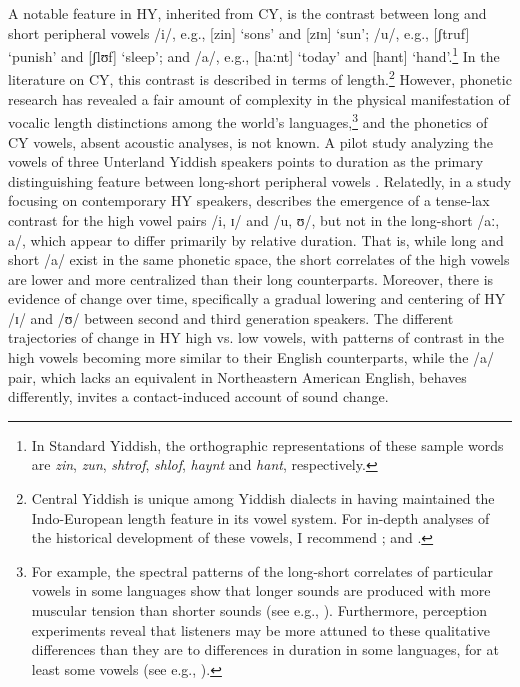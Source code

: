 \documentclass[output=paper]{langsci/langscibook}
\begin{document}
A notable feature in HY, inherited from CY, is the contrast between long and short peripheral vowels /i/, e.g., [zin] ‘sons’ and [zɪn] ‘sun’; /u/, e.g., [ʃtruf] ‘punish’ and [ʃlʊf] ‘sleep’; and /a/, e.g., [haːnt] ‘today’ and [hant] ‘hand’.\footnote{In Standard Yiddish, the orthographic representations of these sample words are \textit{zin}, \textit{zun}, \textit{shtrof}, \textit{shlof}, \textit{haynt} and \textit{hant}, respectively.} In the literature on CY, this contrast is described in terms of length.\footnote{Central Yiddish is unique among Yiddish dialects in having maintained the Indo-European length feature in its vowel system. For in-depth analyses of the historical development of these vowels, I recommend \citep{Jacobs1990, Herzog1964}; and \citep{Beider2015}.} However, phonetic research has revealed a fair amount of complexity in the physical manifestation of vocalic length distinctions among the world’s languages,\footnote{For example, the spectral patterns of the long-short correlates of particular vowels in some languages show that longer sounds are produced with more muscular tension than shorter sounds (see e.g., \citealt{AbramsonRen1990}). Furthermore, perception experiments reveal that listeners may be more attuned to these qualitative differences than they are to differences in duration in some languages, for at least some vowels (see e.g., \citealt{AbramsonRen1990, Lehiste1970, PetersonLehiste1960}).} and the phonetics of CY vowels, absent acoustic analyses, is not known. A pilot study analyzing the vowels of three Unterland Yiddish speakers points to duration as the primary distinguishing feature between long-short peripheral vowels \citep{Nove2020}. Relatedly, in a study focusing on contemporary HY speakers, \citet{Nove2018b} describes the emergence of a tense-lax contrast for the high vowel pairs /i, ɪ/ and /u, ʊ/, but not in the long-short /aː, a/, which appear to differ primarily by relative duration. That is, while long and short /a/ exist in the same phonetic space, the short correlates of the high vowels are lower and more centralized than their long counterparts. Moreover, there is evidence of change over time, specifically a gradual lowering and centering of HY /ɪ/ and /ʊ/ between second and third generation speakers. The different trajectories of change in HY high vs. low vowels, with patterns of contrast in the high vowels becoming more similar to their English counterparts, while the /a/ pair, which lacks an equivalent in Northeastern American English, behaves differently, invites a contact-induced account of sound change.
\end{document}
